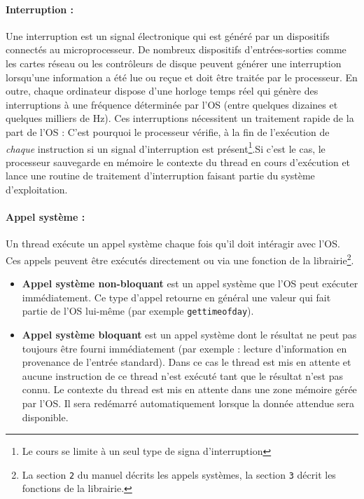 \paragraph{Interruption : } Une interruption est un signal électronique qui est généré par un dispositifs connectés au microprocesseur. De nombreux dispositifs d'entrées-sorties comme les cartes réseau ou les contrôleurs de disque peuvent générer une interruption lorsqu'une information a été lue ou reçue et doit être traitée par le processeur.
En outre, chaque ordinateur dispose d'une horloge temps réel qui génère des interruptions à une fréquence déterminée par l'OS (entre quelques dizaines et quelques milliers de Hz).
Ces interruptions nécessitent un traitement rapide de la part de l'OS : C'est pourquoi le processeur vérifie, à la fin de l'exécution de \textit{chaque} instruction si un signal d'interruption est présent\footnote{Le cours se limite à un seul type de signa d'interruption}.Si c'est le cas, le processeur sauvegarde en mémoire le contexte du thread en cours d'exécution et lance une routine de traitement d'interruption faisant partie du système d'exploitation.

\paragraph{Appel système :} Un thread exécute un appel système chaque fois qu'il doit intéragir avec l'OS.
Ces appels peuvent être exécutés directement ou via une fonction de la librairie\footnote{La section \texttt{2} du manuel décrits les appels systèmes, la section \texttt{3} décrit les fonctions de la librairie.}.

\begin{itemize}
  \item \textbf{Appel système non-bloquant} est un appel système que l'OS peut exécuter immédiatement.
    Ce type d'appel retourne en général une valeur qui fait partie de l'OS lui-même (par exemple \texttt{gettimeofday}).
  \item \textbf{Appel système bloquant} est un appel système dont le résultat ne peut pas toujours être fourni immédiatement (par exemple : lecture d'information en provenance de l'entrée standard).
    Dans ce cas le thread est mis en attente et aucune instruction de ce thread n'est exécuté tant que le résultat n'est pas connu.
    Le contexte du thread est mis en attente dans une zone mémoire gérée par l'OS.
    Il sera redémarré automatiquement lorsque la donnée attendue sera disponible.
\end{itemize}

